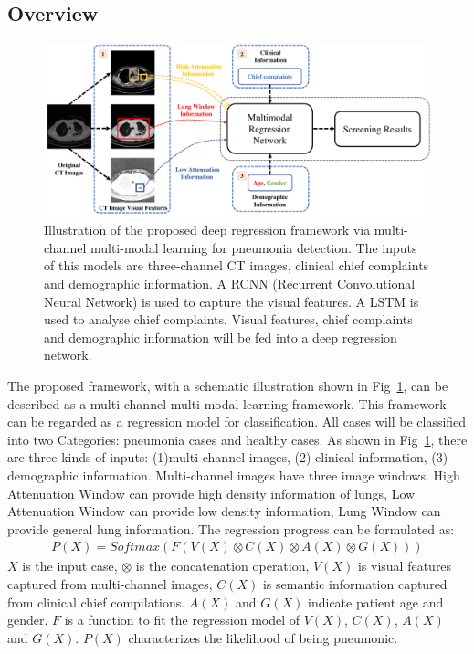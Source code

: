 \documentclass[journal]{IEEEtran}
\begin{document}
\subsection{Overview}
\begin{figure}[htbp]
    \centerline{\includegraphics[width=140mm]{new1.pdf}}
    \vspace{-0cm}
    \caption{Illustration of the proposed deep regression framework via multi-channel multi-modal learning for pneumonia detection.
    The inputs of this models are three-channel CT images, clinical chief complaints and demographic information. A RCNN (Recurrent Convolutional Neural Network) is used to capture the visual features. A LSTM is used to analyse chief complaints. Visual features, chief complaints and demographic information will be fed into a deep regression network.}
    \vspace{-0cm}
    \label{Illustration}

    \end{figure}
The proposed framework, with a schematic illustration shown in Fig~\ref{Illustration}, can be described as a multi-channel multi-modal learning framework. This framework can be regarded as a regression model for classification. All cases will be classified into two Categories: pneumonia cases and healthy cases. As shown in Fig~\ref{Illustration}, there are three kinds of inputs: (1)multi-channel images, (2) clinical information, (3) demographic information. Multi-channel images have three image windows. High Attenuation Window can provide high density information of lungs, Low Attenuation Window can provide low density information, Lung Window can provide general lung information. The regression progress can be formulated as:
\begin{align*}
    P(X) = Softmax(F(V(X) \otimes C(X) \otimes A(X) \otimes G(X)))
\end{align*}
$X$ is the input case, $\otimes$ is the concatenation operation, $V(X)$ is visual features captured from multi-channel images, $C(X)$ is semantic information captured from clinical chief compilations.
$A(X)$ and $G(X)$ indicate patient age and gender. $F$ is a function to fit the regression model of $V(X)$, $C(X)$, $A(X)$ and $G(X)$. $P(X)$ characterizes the likelihood of being pneumonic.
\end{document}
